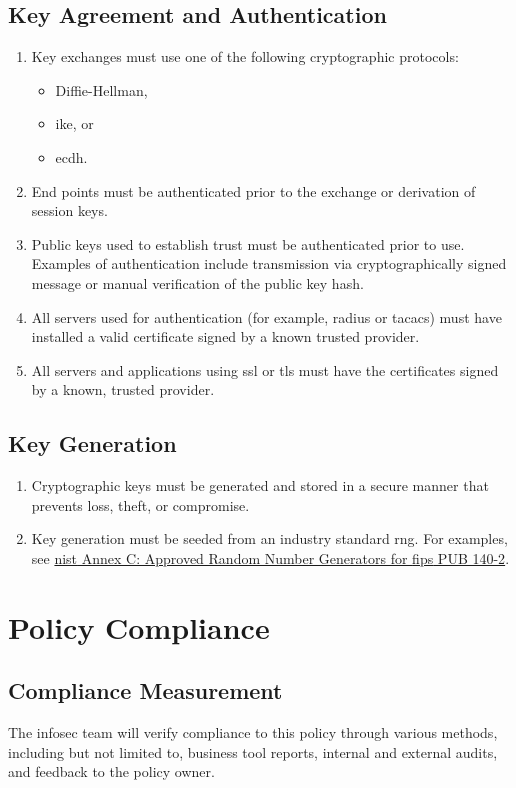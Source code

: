 \subsection{Key Agreement and Authentication}
\begin{enumerate}
\item
Key exchanges must use one of the following cryptographic protocols:
\begin{itemize}
\item{Diffie-Hellman},
\item{\gls{ike}}, or 
\item{\gls{ecdh}}.
\end{itemize}
\item
End points must be authenticated prior to the exchange or derivation of session keys.
\item
Public keys used to establish trust must be authenticated prior to use.  
Examples of authentication include transmission via cryptographically signed message or manual verification of the public key hash.
\item
All servers used for authentication (for example, \gls{radius} or \gls{tacacs}) must have installed a valid certificate signed by a known trusted provider.
\item
All servers and applications using \gls{ssl} or \gls{tls} must have the certificates signed by a known, trusted provider. 
\end{enumerate}
\subsection{Key Generation}
\begin{enumerate}
\item
Cryptographic keys must be generated and stored in a secure manner that prevents loss, theft, or compromise. 
\item
Key generation must be seeded from an industry standard \gls{rng}.  
For examples, see \href{http://csrc.nist.gov/publications/fips/fips140-2/fips1402annexc.pdf}{\acrshort{nist} Annex C: Approved Random Number Generators for \acrshort{fips} PUB 140-2}.  
\end{enumerate}
\section{Policy Compliance}
\subsection{Compliance Measurement}
The \gls{infosec} team will verify compliance to this policy through various methods, including but not limited to, business tool reports, internal and external audits, and feedback to the policy owner. 
